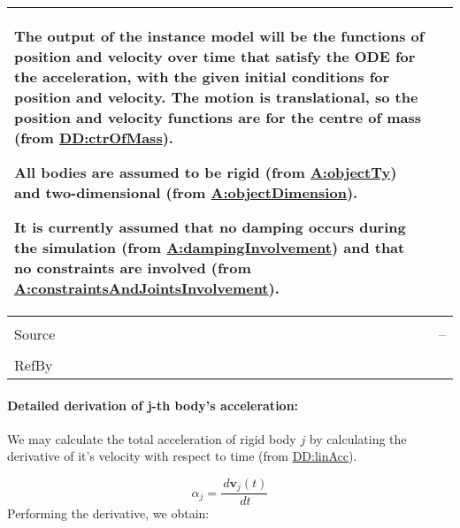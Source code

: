 \documentclass[12pt]{article}
\begin{document}
\begin{minipage}{\textwidth}
\begin{tabular}{>{\raggedright}p{}>{\raggedright\arraybackslash}p{}}
        The output of the instance model will be the functions of position and velocity over time that satisfy the ODE for the acceleration, with the given initial conditions for position and velocity. The motion is translational, so the position and velocity functions are for the centre of mass (from \hyperref[DD:ctrOfMass]{DD:ctrOfMass}).
        
        All bodies are assumed to be rigid (from \hyperref[assumpOT]{A:objectTy}) and two-dimensional (from \hyperref[assumpOD]{A:objectDimension}).
        
        It is currently assumed that no damping occurs during the simulation (from \hyperref[assumpDI]{A:dampingInvolvement}) and that no constraints are involved (from \hyperref[assumpCAJI]{A:constraintsAndJointsInvolvement}).
        
\\ \midrule \\
Source & --
         
\\ \midrule \\
RefBy & 
\\ \bottomrule
\end{tabular}
\end{minipage}
\paragraph{Detailed derivation of j-th body's acceleration:}
\label{IM:transMotDeriv}
We may calculate the total acceleration of rigid body $j$ by calculating the derivative of it's velocity with respect to time (from \hyperref[DD:linAcc]{DD:linAcc}).

\begin{displaymath}
{α_{j}}=\frac{\,d{\symbf{v}_{j}}\left(t\right)}{\,dt}
\end{displaymath}
Performing the derivative, we obtain:
\end{document}
